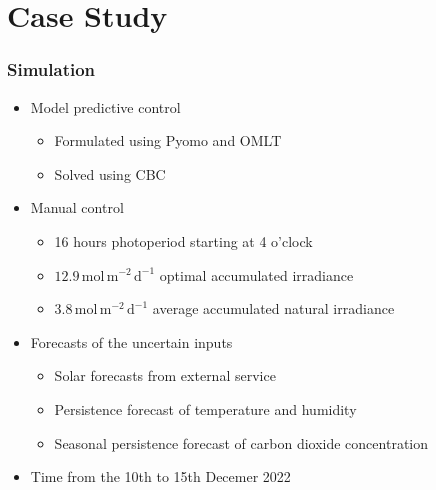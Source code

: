 
\section{Case Study}

\begin{frame}
    \frametitle{Simulation}
    
    \begin{itemize}
        \item Model predictive control
        \begin{itemize}
            \item Formulated using Pyomo and OMLT
            \item Solved using CBC 
        \end{itemize}
        \item Manual control
        \begin{itemize}
            \item 16 hours photoperiod starting at 4 o'clock
            \item $12.9 \, \mathrm{mol} \, \mathrm{m}^{-2} \, \mathrm{d}^{-1}$ optimal accumulated irradiance
            \item $3.8 \, \mathrm{mol} \, \mathrm{m}^{-2} \, \mathrm{d}^{-1}$ average accumulated natural irradiance 
        \end{itemize}
        \item Forecasts of the uncertain inputs
        \begin{itemize}
            \item Solar forecasts from external service
            \item Persistence forecast of temperature and humidity
            \item Seasonal persistence forecast of carbon dioxide concentration 
        \end{itemize}
        \item Time from the 10th to 15th Decemer 2022
    \end{itemize}
\end{frame}

